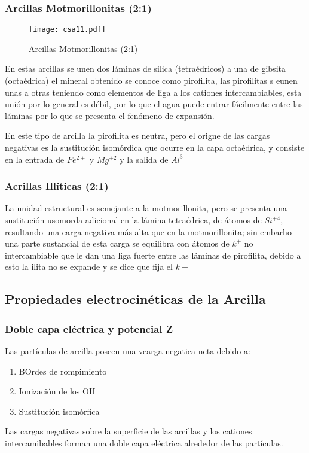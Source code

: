\subsubsection{Arcillas Motmorillonitas (2:1)}
\begin{figure}[h!]
\centering
  \texttt{[image: csa11.pdf]}
  \caption{Arcillas Motmorillonitas (2:1)}
  \label{csa11}
\end{figure}
En estas arcillas se unen dos láminas de silica (tetraédricos) a una de gibsita (octaédrica) el mineral obtenido se conoce como pirofilita, las pirofilitas s eunen unas a otras teniendo como elementos de liga a los cationes intercambiables, esta unión por lo general es débil, por lo que el agua puede entrar fácilmente entre las láminas por lo que se presenta el fenómeno de expansión.

En este tipo de arcilla la pirofilita es neutra, pero el origne de las cargas negativas es la sustitución isomórdica que ocurre en la capa octaédrica, y consiste en la entrada de $Fe^{2+}$ y $Mg^{+2}$ y la salida de $Al^{3+}$
\subsubsection{Acrillas Illíticas (2:1)}
La unidad estructural es semejante a la motmorillonita, pero se presenta una sustitución usomorda adicional en la lámina tetraédrica, de átomos de $Si^{+4}$, resultando una carga negativa más alta que en la motmorillonita; sin embarho una parte sustancial de esta carga se equilibra con átomos de $k^{+}$ no intercambiable que le dan una liga fuerte entre las láminas de pirofilita, debido a esto la ilita no se expande y se dice que fija el $k+$
\subsection{Propiedades electrocinéticas de la Arcilla}
\subsubsection{Doble capa eléctrica y potencial Z}

Las partículas de arcilla poseen una vcarga negatica neta debido a:
\begin{enumerate}
    \item BOrdes de rompimiento
    \item Ionización de los OH
    \item Sustitución isomórfica
\end{enumerate}
Las cargas negativas sobre la superficie de las arcillas y los cationes intercamibables forman una doble capa eléctrica alrededor de las partículas.


